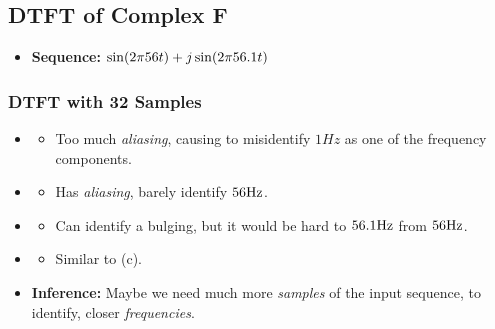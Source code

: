 \documentclass[../../course]{subfiles}
\begin{document}
\pagebreak

\subsection{DTFT of Complex F} \label{ssec:dtftCplxF}

\begin{itemize} [label=]

    \item \textbf{Sequence:} $\sin(2 \pi \freqXTwo t) + j \sin(2 \pi \freqXThree t)$

\end{itemize}

\subsubsection{DTFT with 32 Samples}

\begin{itemize} [label=]

    \item \sampFreqMuchLess
        \begin{itemize} [label=]
            \item Too much \emph{aliasing}, causing to misidentify $1 \si{Hz}$ as one of the
                frequency components.
        \end{itemize}

    \item \sampFreqNorm
        \begin{itemize} [label=]
            \item Has \emph{aliasing}, barely identify $\freqXTwo \si{Hz}$.
        \end{itemize}

    \item \sampFreqSligGreat
        \begin{itemize} [label=]
            \item Can identify a bulging, but it would be hard to $\freqXThree \si{Hz}$ from $\freqXTwo \si{Hz}$.
        \end{itemize}

    \item \sampFreqMuchGreat
        \begin{itemize} [label=]
            \item Similar to (c).
        \end{itemize}

    \item \textbf{Inference:} Maybe we need much more \emph{samples} of the input sequence, to identify,
        closer \emph{frequencies}.

\end{itemize}
\end{document}
